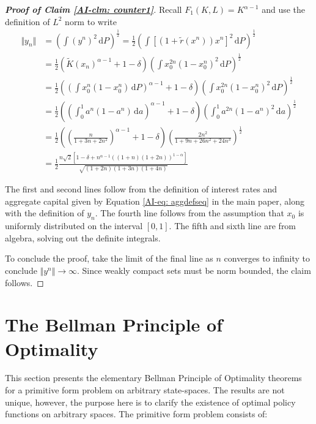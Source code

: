 \documentclass[12pt]{ectaart}
\newcommand{\1}{\mathbbm 1}
\theoremstyle{plain}
\theoremstyle{definition}
\begin{document}
\begin{proof}[\textbf{Proof of Claim \ref{AI-clm: counter1}}]
	Recall $F_{1}(K,L)= K^{\alpha -1}$ and use the definition of $L^{2}$ norm to write 
	\begin{align*}
	\Vert y_{n}\Vert&  = \left(\int (y^{n})^{2}\,\mathrm{d}P\right)^{\frac{1}{2}}=\frac{1}{2}\left( \int[(1+\tilde{r}(x^{n}))x^{n}]^{2}\,\mathrm{d}P\right) ^{\frac{1}{2}}\\ & = \frac{1}{2}(\tilde{K}(x_{n})^{\alpha-1} +1 - \delta)\left(\int x_{0}^{2n}(1-x_{0}^{n})^{2}\,\mathrm{d}P\right) ^{\frac{1}{2}}\\
	& = \frac{1}{2}\left(\left(\int x_{0}^{n}(1-x_{0}^{n})\,\mathrm{d}P\right) ^{\alpha-1} +1 - \delta\right)\left(\int x_{0}^{2n}(1-x_{0}^{n})^{2}\,\mathrm{d}P\right) ^{\frac{1}{2}}\\
	& = \frac{1}{2}\left(\left(\int_{0}^{1} a^{n}(1-a^{n})\,\mathrm{d}a\right) ^{\alpha-1} +1 - \delta\right)\left(\int_{0}^{1} a^{2n}(1-a^{n})^{2}\,\mathrm{d}a\right) ^{\frac{1}{2}}\\
	& = \frac{1}{2}\left(\left(\frac{n}{1+3n+2n^{2}}\right)^{\alpha-1}+1 - \delta\right)\left(\frac{2n^{2}}{1+9n + 26n^{2}+ 24n^{3}}\right)^{\frac{1}{2}}\\
	& = \frac{1}{2}\frac{n\sqrt{2}\left[1 -\delta + n^{\alpha-1}((1 + n)(1 + 2n))^{1 - \alpha}\right]}{
		\sqrt{(1 + 2n)(1 + 3n)(1 + 4n)}}
	\end{align*}
	
	The first and second lines follow from the definition of interest rates and aggregate capital given by Equation  \eqref{AI-eq: aggdefseq} in the main paper, along with the definition of $y_{n}$. The fourth line follows from the assumption that $x_{0}$ is uniformly distributed on the interval $[0,1]$. The fifth and sixth line are from algebra, solving out the definite integrals. 
	
	To conclude the proof, take the limit of the final line as $n$ converges to infinity to conclude  $\Vert y^{n}\Vert\rightarrow  \infty$. Since weakly compact sets must be norm bounded, the claim follows. 
	
	\end{proof}


\section{The Bellman Principle of Optimality}


This section presents the elementary Bellman Principle of Optimality theorems for a primitive form problem on arbitrary state-spaces. The results are not unique, however, the purpose here is to clarify the existence of optimal policy functions on arbitrary spaces. The primitive form problem consists of:
\end{document}
